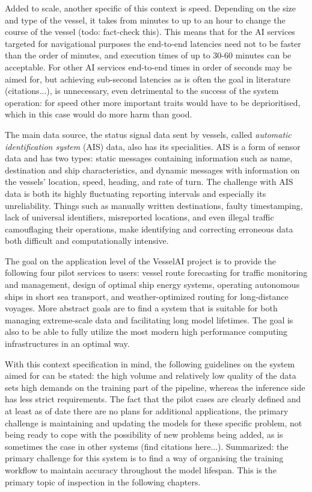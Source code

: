 Added to scale, another specific of this context is speed. Depending on the size and type of the vessel, it takes from minutes to up to an hour to change the course of the vessel (todo: fact-check this). This means that for the AI services targeted for navigational purposes the end-to-end latencies need not to be faster than the order of minutes, and execution times of up to 30-60 minutes can be acceptable. For other AI services end-to-end times in order of seconds may be aimed for, but achieving sub-second latencies as is often the goal in literature (citations...), is unnecessary, even detrimental to the success of the system operation: for speed other more important traits would have to be deprioritised, which in this case would do more harm than good.

The main data source, the status signal data sent by vessels, called \textit{automatic identification system} (AIS) data, also has its specialities. AIS is a form of sensor data and has two types: static messages containing information such as name, destination and ship characteristics, and dynamic messages with information on the vessels' location, speed, heading, and rate of turn. The challenge with AIS data is both its highly fluctuating reporting intervals and especially its unreliability.  Things such as manually written destinations, faulty timestamping, lack of universal identifiers, misreported locations, and even illegal traffic camouflaging their operations, make identifying and correcting erroneous data both difficult and computationally intensive.

The goal on the application level of the VesselAI project is to provide the following four pilot services to users: vessel route forecasting for traffic monitoring and management, design of optimal ship energy systems, operating autonomous ships in short sea transport, and weather-optimized routing for long-distance voyages. More abstract goals are to find a system that is suitable for both managing extreme-scale data and facilitating long model lifetimes. The goal is also to be able to fully utilize the most modern high performance computing infrastructures in an optimal way.

With this context specification in mind, the following guidelines on the system aimed for can be stated: the high volume and relatively low quality of the data sets high demands on the training part of the pipeline, whereas the inference side has less strict requirements. The fact that the pilot cases are clearly defined and at least as of date there are no plans for additional applications, the primary challenge is maintaining and updating the models for these specific problem, not being ready to cope with the possibility of new problems being added, as is sometimes the case in other systems (find citations here...).  Summarized: the primary challenge for this system is to find a way of organising the training workflow to maintain accuracy throughout the model lifespan. This is the primary topic of inspection in the following chapters.

